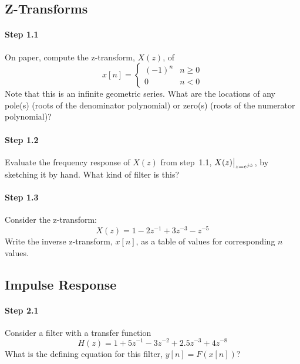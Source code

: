 \subsection{Z-Transforms}

\paragraph{Step 1.1} On paper, compute the z-transform, $X(z)$, of
	\begin{equation}
		x[n] = \left\{
		\begin{array}{ll}
			(-1)^n & n \ge 0 \\
			0 & n < 0
		\end{array}\right.
	\end{equation}
	Note that this is an infinite geometric series.  What are the
        locations of any pole(s) (roots of the denominator polynomial)
        or zero(s) (roots of the numerator polynomial)?


\paragraph{Step 1.2} Evaluate the frequency response of $X(z)$
        from step~1.1, $X(z)\big{|}_{z=e^{j\hat{\omega}}}$, by
        sketching it by hand.  What kind of filter is this?


\paragraph{Step 1.3} Consider the z-transform:
	\begin{equation}
	  X(z) = 1 - 2z^{-1} + 3z^{-3} - z^{-5}  
	\end{equation}
	Write the inverse z-transform, $x[n]$, as a table of values for
	corresponding $n$ values.


\subsection{Impulse Response}

\paragraph{Step 2.1} Consider a filter with a transfer function
	\begin{equation}
	H(z) = 1 + 5z^{-1} - 3z^{-2} + 2.5z^{-3} + 4z^{-8}  
	\end{equation}
	What is the defining equation for this filter, $y[n] = F(x[n])$?


